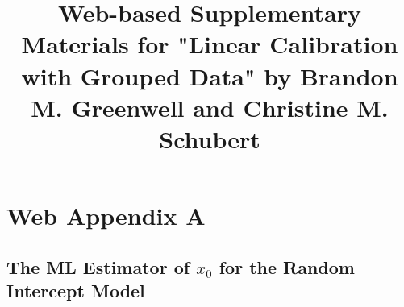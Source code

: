\documentclass{article}\usepackage[]{graphicx}\usepackage[]{color}
\title{Web-based Supplementary Materials for "Linear Calibration with Grouped Data" by Brandon M. Greenwell and Christine M. Schubert}
\date{}
\author{}
\begin{document}
\maketitle




\section*{Web Appendix A}
\subsection*{The ML Estimator of $x_0$ for the Random Intercept Model}

\end{document}
